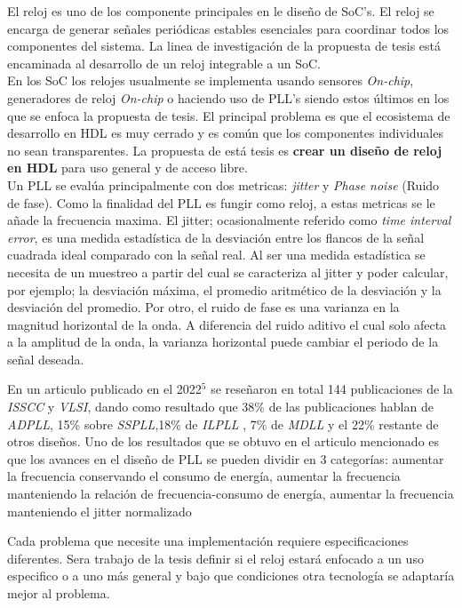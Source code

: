 \documentclass[runningheads,a4paper]{llncs}
\begin{document}
    El reloj es uno de los componente principales en le diseño de SoC's. El reloj se encarga de generar señales periódicas estables esenciales para coordinar todos los componentes del sistema. La linea de investigación de la propuesta de tesis está encaminada al desarrollo de un reloj integrable a un SoC.\\

   En los SoC los relojes usualmente se implementa usando sensores \textit{On-chip}, generadores de reloj \textit{On-chip} o haciendo uso de PLL's siendo estos últimos en los que se enfoca la propuesta de tesis. El principal problema es que el ecosistema de desarrollo en HDL es muy cerrado y es común que los componentes individuales no sean transparentes. La propuesta de está tesis es \textbf{crear un diseño de reloj en HDL} para uso general y de acceso libre.\\

    Un PLL se evalúa principalmente con dos metricas: \textit{jitter} y \textit{Phase noise} (Ruido de fase). Como la finalidad del PLL es fungir como reloj, a estas metricas se le añade la frecuencia maxima.
    El jitter; ocasionalmente referido como \textit{time interval error}, es una medida estadística de la desviación entre los flancos de la señal cuadrada ideal comparado con la señal real. Al ser una medida estadística se necesita de un muestreo a partir del cual se caracteriza al jitter y poder calcular, por ejemplo; la desviación máxima, el promedio aritmético de la desviación y la desviación del promedio. Por otro, el ruido de fase es una varianza en la magnitud horizontal de la onda. A diferencia del ruido aditivo el cual solo afecta a la amplitud de la onda, la varianza horizontal puede cambiar el periodo de la señal deseada.

    En un articulo publicado en el 2022${}^5$ se reseñaron en total 144 publicaciones de la \textit{ISSCC} y \textit{VLSI}, dando como resultado que 38\% de las publicaciones hablan de \textit{ADPLL}, 15\% sobre \textit{SSPLL},18\% de \textit{ILPLL} , 7\% de \textit{MDLL} y el 22\% restante de otros diseños.
    Uno de los resultados que se obtuvo en el articulo mencionado es que los avances en el diseño de PLL se pueden dividir en 3 categorías: aumentar la frecuencia conservando el consumo de energía, aumentar la frecuencia manteniendo la relación de frecuencia-consumo de energía, aumentar la frecuencia manteniendo el jitter normalizado
    
    Cada problema que necesite una implementación requiere especificaciones diferentes. Sera trabajo de la tesis definir si el reloj estará enfocado a un uso especifico o a uno más general y bajo que condiciones otra tecnología se adaptaría mejor al problema.
\end{document}
